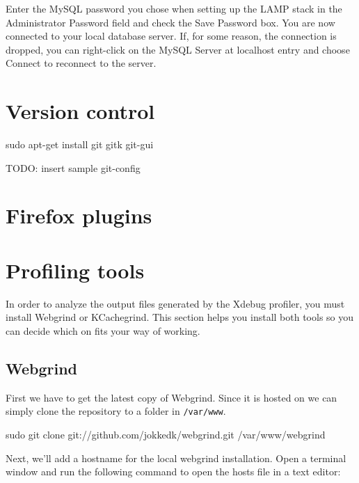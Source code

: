 \documentclass[draft,ebook,10pt,twoside,openright]{memoir}
\begin{document}
Enter the MySQL password you chose when setting up the LAMP stack in the Administrator Password field and check the Save Password box. You are now connected to your local database server. If, for some reason, the connection is dropped, you can right-click on the MySQL Server at localhost entry and choose Connect to reconnect to the server.

\section{Version control}

\begin{squashboxcommand}
sudo apt-get install git gitk git-gui
\end{squashboxcommand}

TODO: insert sample git-config

\section{Firefox plugins}


\section{Profiling tools}

In order to analyze the output files generated by the Xdebug profiler, you must install Webgrind or KCachegrind. This section helps you install both tools so you can decide which on fits your way of working.

\subsection{Webgrind}

First we have to get the latest copy of Webgrind. Since it is hosted on  we can simply clone the repository to a folder in \verb!/var/www!.

\begin{squashboxcommand}
sudo git clone git://github.com/jokkedk/webgrind.git /var/www/webgrind
\end{squashboxcommand}

Next, we’ll add a hostname for the local webgrind installation. Open a terminal window and run the following command to open the hosts file in a text editor:
\end{document}
